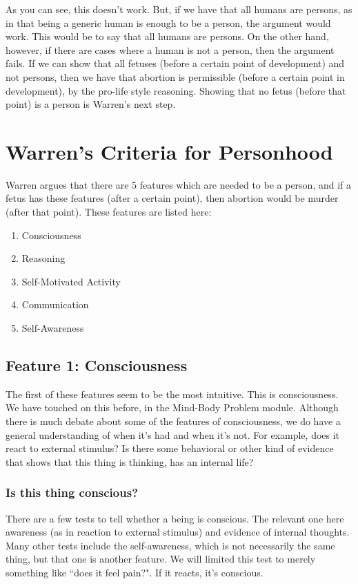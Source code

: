 As you can see, this doesn’t work. But, if we have that all humans are persons, as in that being a generic human is enough to be a person, the argument would work. This would be to say that all humans are persons. On the other hand, however, if there are cases where a human is not a person, then the argument fails. If we can show that all fetuses (before a certain point of development) and not persons, then we have that abortion is permissible (before a certain point in development), by the pro-life style reasoning. Showing that no fetus (before that point) is a person is Warren's next step.  

\section{Warren's Criteria for Personhood}
Warren argues that there are 5 features which are needed to be a person, and if a fetus has these features (after a certain point), then abortion would be murder (after that point). These features are listed here:

\begin{enumerate}
\item Consciousness 	
\item Reasoning
\item Self-Motivated Activity 
\item Communication
\item Self-Awareness
\end{enumerate}

\subsection{Feature 1: Consciousness}

The first of these features seem to be the most intuitive. This is consciousness. We have touched on this before, in the Mind-Body Problem module. Although there is much debate about some of the features of consciousness, we do have a general understanding of when it's had and when it's not. For example, does it react to external stimulus? Is there some behavioral or other kind of evidence that shows that this thing is thinking, has an internal life? 

\subsubsection{Is this thing conscious?}

There are a few tests to tell whether a being is conscious. The relevant one here awareness (as in reaction to external stimulus) and evidence of internal thoughts. Many other tests include the self-awareness, which is not necessarily the same thing, but that one is another feature. We will limited this test to merely something like ``does it feel pain?". If it reacts, it's conscious.

